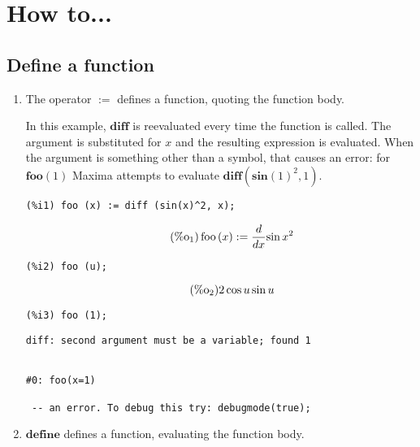 \documentclass[12pt,leqno]{article}
\begin{document}
\section{How to...}

\subsection{Define a function}

\begin{enumerate}

\item The operator $\mathbf{:=}$ defines a function, quoting the function body.

In this example, $\mathbf{diff}$ is reevaluated every time the function is called.
The argument is substituted for $x$ and the resulting expression is evaluated.
When the argument is something other than a symbol, that causes an error:
for $\mathbf{foo} (1)$ Maxima attempts to evaluate $\mathbf{diff} (\mathbf{sin}(1)^2, 1)$.
\begin{verbatim}
(%i1) foo (x) := diff (sin(x)^2, x);
\end{verbatim}
\begin{equation}
\tag{$\mathop{\mathrm{\%o}_{1}}$}\mathop{\mathrm{foo}}\left(x\right) := \frac{d}{d x}{\sin x}^{2}
\label{eq:doc-group1-code26-1-1}
\end{equation}
\begin{verbatim}
(%i2) foo (u);
\end{verbatim}
\begin{equation}
\tag{$\mathop{\mathrm{\%o}_{2}}$}2 \cos u \sin u
\label{eq:doc-group1-code26-2-1}
\end{equation}
\begin{verbatim}
(%i3) foo (1);
\end{verbatim}
\begin{Verbatim}
diff: second argument must be a variable; found 1


#0: foo(x=1)

 -- an error. To debug this try: debugmode(true);
\end{Verbatim}


\item $\mathbf{define}$ defines a function, evaluating the function body.


\end{enumerate}
\end{document}
